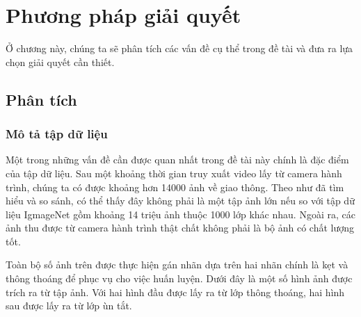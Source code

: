 \chapter{Phương pháp giải quyết}
Ở chương này, chúng ta sẽ phân tích các vấn đề cụ thể trong đề tài và đưa ra lựa chọn giải quyết cần thiết.\par 
\section{Phân tích}
	\subsection{Mô tả tập dữ liệu}
	Một trong những vấn đề cần được quan nhất trong đề tài này chính là đặc điểm của tập dữ liệu. Sau một khoảng thời gian truy xuất video lấy từ camera hành trình, chúng ta có được khoảng hơn 14000 ảnh về giao thông. Theo như đã tìm hiểu và so sánh, có thể thấy đây không phải là một tập ảnh lớn nếu so với tập dữ liệu IgmageNet gồm khoảng 14 triệu ảnh thuộc 1000 lớp khác nhau. Ngoài ra, các ảnh thu được từ camera hành trình thật chất không phải là bộ ảnh có chất lượng tốt.\par 
	Toàn bộ số ảnh trên được thực hiện gán nhãn dựa trên hai nhãn chính là kẹt và thông thoáng để phục vụ cho việc huấn luyện. Dưới đây là một số hình ảnh được trích ra từ tập ảnh. Với hai hình đầu được lấy ra từ lớp thông thoáng, hai hình sau được lấy ra từ lớp ùn tắt.
